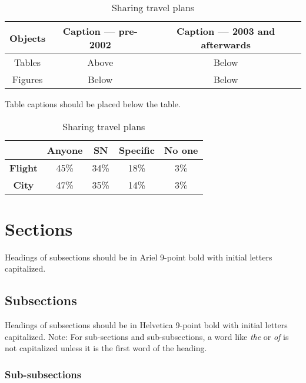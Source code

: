 \documentclass{scsPaperFormattingTemplate-LaTex-Revised20160302}
\newcommand\tabhead[1]{\small\textbf{#1}}
\begin{document}
\begin{table}
  \centering
  \begin{tabular}{|c|c|c|}
    \hline
    \tabhead{Objects} &
    \multicolumn{1}{|p{0.3\columnwidth}|}{\centering\tabhead{Caption --- pre-2002}} &
    \multicolumn{1}{|p{0.4\columnwidth}|}{\centering\tabhead{Caption --- 2003 and afterwards}} \\
    \hline
    Tables & Above & Below \\
    \hline
    Figures & Below & Below \\
    \hline
  \end{tabular}
  \caption{Table captions should be placed below the table.}
  \label{tab:table1}
  \hfill \break
  \centering
  \begin{tabular}{|c|c|c|c|c|}
	\hline
	\tabhead{} &
	\multicolumn{1}{|p{0.15\columnwidth}|}{\centering\tabhead{Anyone}} &
	\multicolumn{1}{|p{0.15\columnwidth}|}{\centering\tabhead{SN}} &
	\multicolumn{1}{|p{0.15\columnwidth}|}{\centering\tabhead{Specific}} &
	\multicolumn{1}{|p{0.15\columnwidth}|}{\centering\tabhead{No one}} \\
	\hline
	\textbf{Flight} & 45\% & 34\% & 18\% & 3\% \\
	\hline
	\textbf{City} & 47\% & 35\% & 14\% & 3\% \\
	\hline
  \end{tabular}
  \caption{Sharing travel plans}
  \label{tab:table2}
\end{table}

\section{Sections}

Headings of subsections should be in Ariel 9-point bold with initial letters capitalized.

\subsection{Subsections}

Headings of subsections should be in Helvetica 9-point bold with
initial letters capitalized. Note: For sub-sections and sub-subsections, a word like \emph{the} or \emph{of} is not capitalized unless it is the first word of the heading.

\subsubsection{Sub-subsections}
\end{document}
